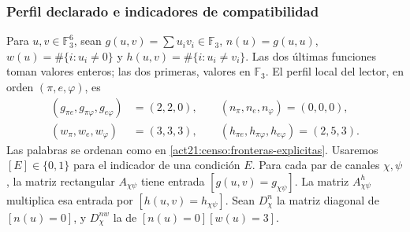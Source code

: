 \subsubsection{Perfil declarado e indicadores de compatibilidad}

Para \(u,v\in\mathbb F_3^6\), sean
\(g(u,v)=\sum u_iv_i\in\mathbb F_3\),
\(n(u)=g(u,u)\), \(w(u)=\#\{i:u_i\ne0\}\) y
\(h(u,v)=\#\{i:u_i\ne v_i\}\). Las dos últimas funciones toman
valores enteros; las dos primeras, valores en \(\mathbb F_3\).
El perfil local del lector, en orden \((\pi,e,\varphi)\), es
\begin{equation}
 \begin{split}
 (g_{\pi e},g_{\pi\varphi},g_{e\varphi})&=(2,2,0),\qquad
 (n_\pi,n_e,n_\varphi)=(0,0,0),\\
 (w_\pi,w_e,w_\varphi)&=(3,3,3),\qquad
 (h_{\pi e},h_{\pi\varphi},h_{e\varphi})=(2,5,3).
 \end{split}
 \label{act21:censo:perfil-local}
\end{equation}
Las palabras se ordenan como en \eqref{act21:censo:fronteras-explicitas}.
Usaremos \([E]\in\{0,1\}\) para el indicador de una condición \(E\).
Para cada par de canales \(\chi,\psi\), la matriz rectangular
\(A_{\chi\psi}\) tiene entrada \([g(u,v)=g_{\chi\psi}]\).
La matriz \(A^{h}_{\chi\psi}\) multiplica esa entrada por
\([h(u,v)=h_{\chi\psi}]\). Sean \(D_\chi^n\) la matriz diagonal
de \([n(u)=0]\), y \(D_\chi^{nw}\) la de
\([n(u)=0][w(u)=3]\).

